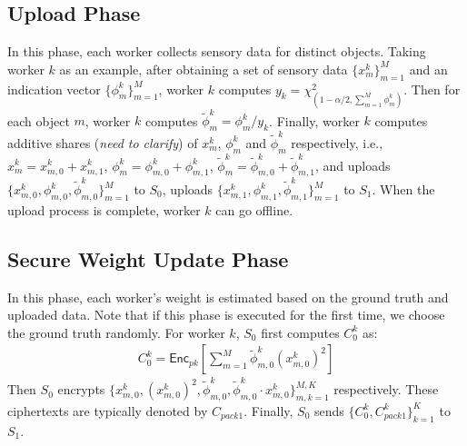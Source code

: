 \documentclass[conference]{IEEEtran}
\begin{document}
\subsection{Upload Phase}

In this phase, each worker collects sensory data for distinct objects.
Taking worker $k$ as an example, after obtaining a set of sensory data $\{x_m^k\}_{m=1}^M$ and an indication vector $\{\phi_m^k\}_{m=1}^M$, worker $k$ computes $y_k = \chi^2_{(1-\alpha/2, \sum_{m=1}^M \phi_m^k)}$.
Then for each object $m$, worker $k$ computes $\tilde{\phi}_m^k = \phi_m^k / y_k$.
Finally, worker $k$ computes additive shares ({\em need to clarify}) of $x_m^k$, $\phi_m^k$ and $\tilde{\phi}_m^k$ respectively, i.e., $x_m^k = x_{m,0}^k + x_{m,1}^k$, $\phi_m^k = \phi_{m,0}^k + \phi_{m,1}^k$, $\tilde{\phi}_m^k = \tilde{\phi}_{m,0}^k + \tilde{\phi}_{m,1}^k$, and uploads $\{x_{m,0}^k, \phi_{m,0}^k ,\tilde{\phi}_{m,0}^k\}_{m=1}^M$ to $S_0$, uploads $\{x_{m,1}^k, \phi_{m,1}^k, \tilde{\phi}_{m,1}^k\}_{m=1}^M$ to $S_1$.
When the upload process is complete, worker $k$ can go offline.

\subsection{Secure Weight Update Phase}

In this phase, each worker's weight is estimated based on the ground truth and uploaded data.
Note that if this phase is executed for the first time, we choose the ground truth randomly.
For worker $k$, $S_0$ first computes $C_0^k$ as: 
\begin{equation}
  \begin{split}
  C_0^k = \mathsf{Enc}_{pk}\left[\sum_{m=1}^M \tilde{\phi}_{m,0}^k \left(x_{m,0}^k\right)^2\right]
  \end{split}
\end{equation}
Then $S_0$ encrypts $\{x_{m,0}^k, (x_{m,0}^k)^2, \tilde{\phi}_{m,0}^k,\tilde{\phi}_{m,0}^k\cdot x_{m,0}^k\}_{m,k=1}^{M,K}$ respectively.
These ciphertexts are typically denoted by $C_{pack1}$.
Finally, $S_0$ sends $\{C_0^k, C_{pack1}^k\}_{k=1}^K$ to $S_1$.
\end{document}
